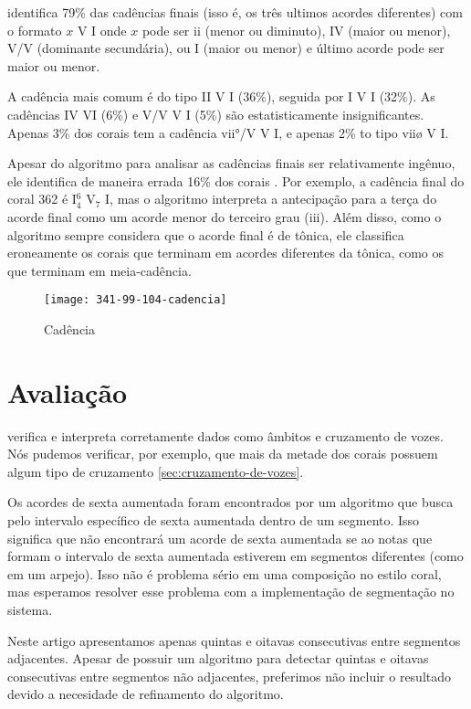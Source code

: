 \rameau{} identifica 79\% das cadências finais (isso é, os três
ultimos acordes diferentes) com o formato $x$ V I onde $x$ pode ser ii
(menor ou diminuto), IV (maior ou menor), V/V (dominante secundária),
ou I (maior ou menor) e último acorde pode ser maior ou menor.

A cadência mais comum é do tipo II V I (36\%), seguida por I V I
(32\%). As cadências IV VI (6\%) e V/V V I (5\%) são estatisticamente
insignificantes. Apenas 3\% dos corais tem a cadência vii°/V V I, e
apenas 2\% to tipo viiø V I.

Apesar do algoritmo para analisar as cadências finais ser
relativamente ingênuo, ele identifica de maneira errada 16\% dos
corais . Por
exemplo, a cadência final do coral 362 é I$^6_4$ V$_7$ I, mas o algoritmo
interpreta a antecipação para a terça do acorde final como um acorde
menor do terceiro grau (iii). Além disso, como o algoritmo sempre
considera que o acorde final é de tônica, ele classifica eroneamente
os corais que terminam em acordes diferentes da tônica, como os que
terminam em meia-cadência.

\begin{figure}
  \centering
  \texttt{[image: 341-99-104-cadencia]}
  \caption{Cadência}
  \label{fig:cadencia}
\end{figure}

\section{Avaliação}
\label{sec:avaliacao}

\rameau{} verifica e interpreta corretamente dados como âmbitos e
cruzamento de vozes. Nós pudemos verificar, por exemplo, que mais da
metade dos corais possuem algum tipo de cruzamento
\ref{sec:cruzamento-de-vozes}.

Os acordes de sexta aumentada foram encontrados por um algoritmo que
busca pelo intervalo específico de sexta aumentada dentro de um
segmento. Isso significa que \rameau{} não encontrará um acorde de
sexta aumentada se ao notas que formam o intervalo de sexta aumentada
estiverem em segmentos diferentes (como em um arpejo). Isso não é
problema sério em uma composição no estilo coral, mas esperamos
resolver esse problema com a implementação de segmentação no sistema.

Neste artigo apresentamos apenas quintas e oitavas consecutivas entre
segmentos adjacentes. Apesar de \rameau{} possuir um algoritmo para
detectar quintas e oitavas consecutivas entre segmentos não
adjacentes, preferimos não incluir o resultado devido a necesidade de
refinamento do algoritmo.

